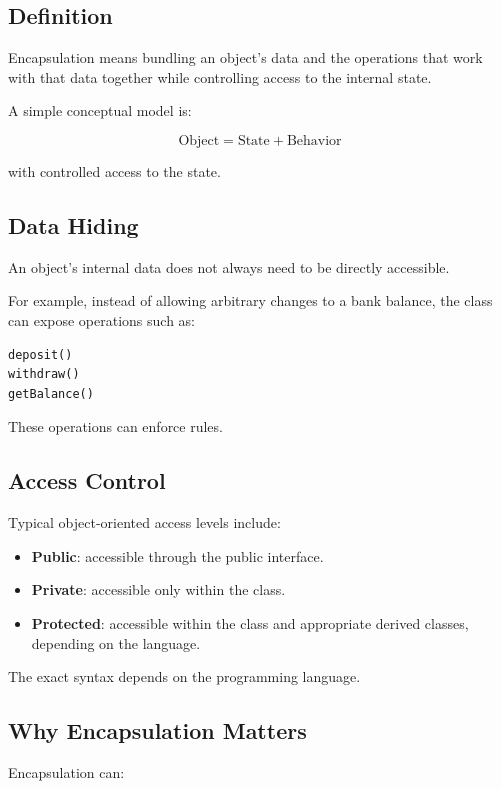 \documentclass[11pt,a4paper]{article}
\begin{document}
\subsection{Definition}

Encapsulation means bundling an object's data and the operations that work
with that data together while controlling access to the internal state.

A simple conceptual model is:

\[
\boxed{\text{Object} = \text{State} + \text{Behavior}}
\]

with controlled access to the state.

\subsection{Data Hiding}

An object's internal data does not always need to be directly accessible.

For example, instead of allowing arbitrary changes to a bank balance, the
class can expose operations such as:

\begin{verbatim}
deposit()
withdraw()
getBalance()
\end{verbatim}

These operations can enforce rules.

\subsection{Access Control}

Typical object-oriented access levels include:

\begin{itemize}
    \item \textbf{Public}: accessible through the public interface.
    \item \textbf{Private}: accessible only within the class.
    \item \textbf{Protected}: accessible within the class and appropriate
    derived classes, depending on the language.
\end{itemize}

The exact syntax depends on the programming language.

\subsection{Why Encapsulation Matters}

Encapsulation can:
\end{document}
